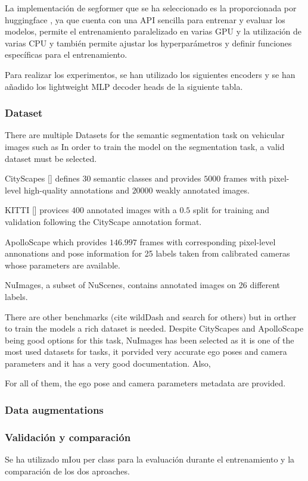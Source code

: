 La implementación de segformer que se ha seleccionado es la proporcionada por huggingface \cite{huggingface}, ya que cuenta con una API sencilla para entrenar y evaluar los modelos, permite el entrenamiento paralelizado en varias GPU y la utilización de varias CPU y también permite ajustar los hyperparámetros y definir funciones específicas para el entrenamiento.

Para realizar los experimentos, se han utilizado los siguientes encoders y se han añadido los lightweight MLP decoder heads de la siguiente tabla. 

\subsubsection{Dataset}
There are multiple Datasets for the semantic segmentation task on vehicular images such as 
In order to train the model on the segmentation task, a valid dataset must be selected. 

CityScapes [] defines $30$ semantic classes and provides $5000$ frames with pixel-level high-quality annotations and $20000$ weakly annotated images. 

KITTI [] provices $400$ annotated images with a $0.5$ split for training and validation following the CityScape annotation format. 

ApolloScape \cite{ApolloScape} which provides $146.997$ frames with corresponding pixel-level annonations and pose information for 25 labels taken from calibrated cameras whose parameters are available.

NuImages, a subset of NuScenes, contains annotated images on 26 different labels.

There are other benchmarks (cite wildDash and search for others) but in orther to train the models a rich dataset is needed. Despite CityScapes and ApolloScape being good options for this task, NuImages has been selected as it is one of the most used datasets for  tasks, it porvided very accurate ego poses and camera parameters and it has a very good documentation. Also, 






For all of them, the ego pose and camera parameters metadata are provided. 


\subsubsection{Data augmentations}
\subsubsection{Validación y comparación}
Se ha utilizado mIou per class para la evaluación durante el entrenamiento y la comparación de los dos aproaches.


